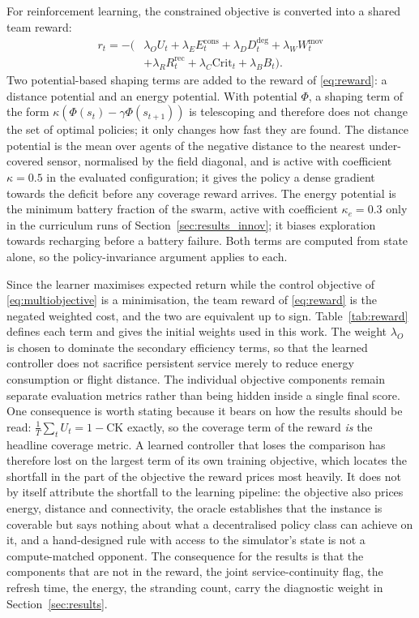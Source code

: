 \documentclass[conference]{IEEEtran}
\begin{document}
For reinforcement learning, the constrained objective is converted into a shared team reward:
\begin{equation}
\begin{aligned}
r_t=-\big(&\lambda_O U_t+\lambda_E E_t^{\mathrm{cons}}+
          \lambda_D D_t^{\mathrm{deg}}+\lambda_W W_t^{\mathrm{mov}}\\
&+\lambda_R R_t^{\mathrm{rec}}+\lambda_C\mathrm{Crit}_t+\lambda_B B_t\big).
\end{aligned}
\label{eq:reward}
\end{equation}
Two potential-based shaping terms are added to the reward of \eqref{eq:reward}: a distance potential and an energy potential.  With potential $\Phi$, a shaping term of the form $\kappa(\Phi(s_t)-\gamma\Phi(s_{t+1}))$ is telescoping and therefore does not change the set of optimal policies; it only changes how fast they are found.  The distance potential is the mean over agents of the negative distance to the nearest under-covered sensor, normalised by the field diagonal, and is active with coefficient $\kappa=0.5$ in the evaluated configuration; it gives the policy a dense gradient towards the deficit before any coverage reward arrives.  The energy potential is the minimum battery fraction of the swarm, active with coefficient $\kappa_e=0.3$ only in the curriculum runs of Section~\ref{sec:results_innov}; it biases exploration towards recharging before a battery failure.  Both terms are computed from state alone, so the policy-invariance argument applies to each.

Since the learner maximises expected return while the control objective of \eqref{eq:multiobjective} is a minimisation, the team reward of \eqref{eq:reward} is the negated weighted cost, and the two are equivalent up to sign. Table~\ref{tab:reward} defines each term and gives the initial weights used in this work. The weight $\lambda_O$ is chosen to dominate the secondary efficiency terms, so that the learned controller does not sacrifice persistent service merely to reduce energy consumption or flight distance. The individual objective components remain separate evaluation metrics rather than being hidden inside a single final score.  One consequence is worth stating because it bears on how the results should be read: $\frac1T\sum_t U_t = 1-\mathrm{CK}$ exactly, so the coverage term of the reward \emph{is} the headline coverage metric.  A learned controller that loses the comparison has therefore lost on the largest term of its own training objective, which locates the shortfall in the part of the objective the reward prices most heavily.  It does not by itself attribute the shortfall to the learning pipeline: the objective also prices energy, distance and connectivity, the oracle establishes that the instance is coverable but says nothing about what a decentralised policy class can achieve on it, and a hand-designed rule with access to the simulator's state is not a compute-matched opponent.  The consequence for the results is that the components that are not in the reward, the joint service-continuity flag, the refresh time, the energy, the stranding count, carry the diagnostic weight in Section~\ref{sec:results}.
\end{document}
